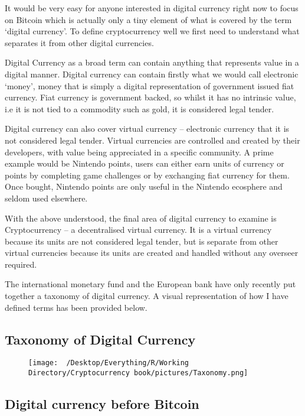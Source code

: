 \documentclass[]{book}
\theoremstyle{definition}
\theoremstyle{definition}
\theoremstyle{definition}
\theoremstyle{remark}
\begin{document}
It would be very easy for anyone interested in digital currency right
now to focus on Bitcoin which is actually only a tiny element of what is
covered by the term `digital currency'. To define cryptocurrency well we
first need to understand what separates it from other digital
currencies.

Digital Currency as a broad term can contain anything that represents
value in a digital manner. Digital currency can contain firstly what we
would call electronic `money', money that is simply a digital
representation of government issued fiat currency. Fiat currency is
government backed, so whilst it has no intrinsic value, i.e it is not
tied to a commodity such as gold, it is considered legal tender.

Digital currency can also cover virtual currency -- electronic currency
that it is not considered legal tender. Virtual currencies are
controlled and created by their developers, with value being appreciated
in a specific community. A prime example would be Nintendo points, users
can either earn units of currency or points by completing game
challenges or by exchanging fiat currency for them. Once bought,
Nintendo points are only useful in the Nintendo ecosphere and seldom
used elsewhere.

With the above understood, the final area of digital currency to examine
is Cryptocurrency -- a decentralised virtual currency. It is a virtual
currency because its units are not considered legal tender, but is
separate from other virtual currencies because its units are created and
handled without any overseer required.

The international monetary fund and the European bank have only recently
put together a taxonomy of digital currency. A visual representation of
how I have defined terms has been provided below.

\subsection{Taxonomy of Digital
Currency}\label{taxonomy-of-digital-currency}

\begin{figure}[htbp]
\centering
\texttt{[image: ~/Desktop/Everything/R/Working Directory/Cryptocurrency book/pictures/Taxonomy.png]}
\caption{}
\end{figure}

\subsection{Digital currency before
Bitcoin}\label{digital-currency-before-bitcoin}
\end{document}
